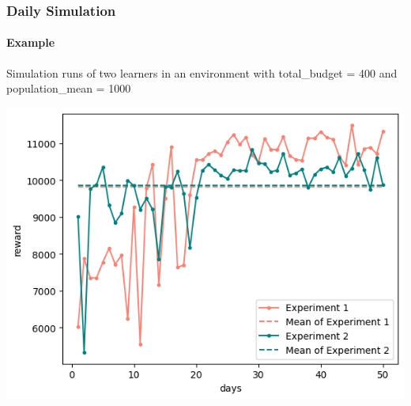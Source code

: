 
\begin{frame}

\frametitle{Daily Simulation}
\framesubtitle{Example}

\scriptsize
Simulation runs of two learners in an environment with total\_budget = 400 and population\_mean = 1000

\begin{center}
    \includegraphics[scale=0.5]{img/Graphs/env_sim/image1.png}
\end{center}


\end{frame}

